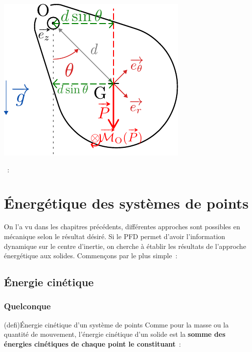 \documentclass[../../main/main.tex]{subfiles}
\begin{document}
\begin{tcb*}
\begin{minipage}[t]{0.25\linewidth}
\begin{center}
{			}{
				\includegraphics[width=\linewidth]{ppesant_complet}
			}
			\vspace{-15pt}
			\captionsetup{justification=centering}
		\end{center}
	\end{minipage}
	\begin{enumerate}[label=\sqenumi, start=6]
		~:
		\vspace{-20pt}
		\psw{
			\[
				\dv{\Lc_z}{t} = J_z \tpp = \Mc_z(\Pf)
				\Lra
				\boxed{\tpp + \frac{mgd}{J_z} \sin(\th) = 0}
			\]
		}
	\end{enumerate}
\end{tcb*}

\section{Énergétique des systèmes de points}
On l'a vu dans les chapitres précédents, différentes approches sont possibles en
mécanique selon le résultat désiré. Si le PFD permet d'avoir l'information
dynamique sur le centre d'inertie, on cherche à établir les résultats de
l'approche énergétique aux solides. Commençons par le plus simple~:
\subsection{Énergie cinétique}
\subsubsection{Quelconque}
\begin{tcb*}(defi){Énergie cinétique d'un système de points}
	Comme pour la masse ou la quantité de mouvement, l'énergie cinétique d'un
	solide est la \textbf{somme des énergies cinétiques de chaque point le
		constituant}~:
	\psw{
	\[
		\boxed{\Ec_{c/\Rc}(\Sc) = \sum_i\Ec_{c/\Rc}(\Mr_i) = \sum_i
		\frac{1}{2}m_iv_{i/\Rc}{}^2}
	\]
	}
	\vspace{-15pt}
\end{tcb*}
\end{document}
